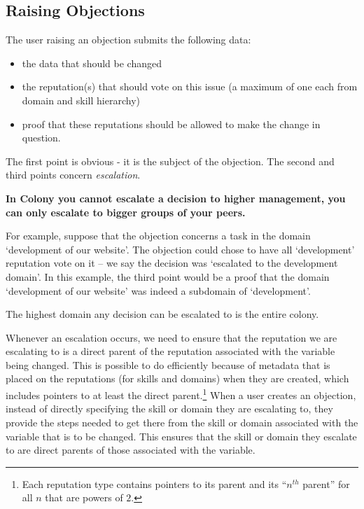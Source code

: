 \subsection{Raising Objections}\label{subsec:raising-objections}

The user raising an objection submits the following data:
\begin{itemize}
 \item the data that should be changed
 \item the reputation(s) that should vote on this issue (a maximum of one each from domain and skill hierarchy)
 \item proof that these reputations should be allowed to make the change in question. 
\end{itemize}

The first point is obvious - it is the subject of the objection. The second and third points concern \emph{escalation}. 

\begin{center}
 \textbf{In Colony you cannot escalate a decision to higher management, you can only escalate to bigger groups of your peers.}
\end{center}

For example, suppose that the objection concerns a task in the domain `development of our website'. The objection could chose to have all `development' reputation vote on it -- we say the decision was `escalated to the development domain'. In this example, the third point would be a proof that the domain `development of our website' was indeed a subdomain of `development'.

The highest domain any decision can be escalated to is the entire colony.


Whenever an escalation occurs, we need to ensure that the reputation we are escalating to is a direct parent of the reputation associated with the variable being changed. This is possible to do efficiently because of metadata that is placed on the reputations (for skills and domains) when they are created, which includes pointers to at least the direct parent.\footnote{Each reputation type contains pointers to its parent  and its ``$n^{th}$ parent''  for all $n$ that are powers of $2$.} When a user creates an objection, instead of directly specifying the skill or domain they are escalating to, they provide the steps needed to get there from the skill or domain associated with the variable that is to be changed. This ensures that the skill or domain they escalate to are direct parents of those associated with the variable.

